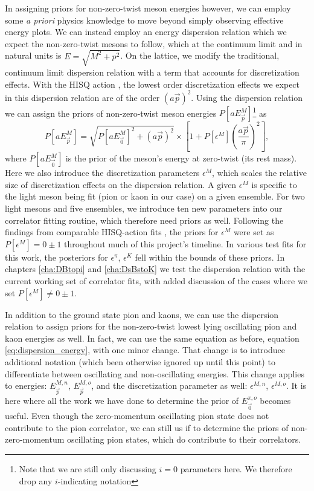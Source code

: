 In assigning priors for non-zero-twist meson energies however, we can employ some \textit{a priori} physics knowledge to move beyond simply observing effective energy plots.  We can instead employ an energy dispersion relation which we expect the non-zero-twist mesons to follow, which at the continuum limit and in natural units is $E = \sqrt{M^2 + p^2}$.  On the lattice, we modify the traditional, continuum limit dispersion relation with a term that accounts for discretization effects.  With the HISQ action \cite{HISQ:2006rc}, the lowest order discretization effects we expect in this dispersion relation are of the order $(a\vec{p})^2$.  Using the dispersion relation we can assign the priors of non-zero-twist meson energies $P[aE^M_{\vec{p}}]$\footnote{Note that we are still only discussing $i=0$ parameters here.  We therefore drop any $i$-indicating notation} as
\begin{equation}\label{eq:dispersion_energy}
   P[aE^M_{\vec{p}}] = \sqrt{P[aE^M_{\vec{0}}]^2 + (a\vec{p})^2}
   \times \left[ 1 + P[\epsilon^M] \left( \frac{a\vec{p}}{\pi} \right)^2     \right],
\end{equation}
where $P[aE^M_{\vec{0}}]$ is the prior of the meson's energy at zero-twist (its rest mass).  Here we also introduce the discretization parameters $\epsilon^M$, which scales the relative size of discretization effects on the dispersion relation.  A given $\epsilon^M$ is specific to the light meson being fit (pion or kaon in our case) on a given ensemble.  For two light mesons and five ensembles, we introduce ten new parameters into our correlator fitting routine, which therefore need priors as well.  Following the findings from comparable HISQ-action fits \cite{Bouchard_2013, Will_towardsB, Chakraborty_2021, Will_technical}, the priors for $\epsilon^{M}$ were set as $P[\epsilon^M] = 0\pm1$ throughout much of this project's timeline.  In various test fits for this work, the posteriors for $\epsilon^{\pi}$, $\epsilon^{K}$ fell within the bounds of these priors. In chapters \ref{cha:DBtopi} and \ref{cha:DsBstoK} we test the dispersion relation with the current working set of correlator fits, with added discussion of the cases where we set $P[\epsilon^M] \neq 0\pm1$.

In addition to the ground state pion and kaons, we can use the dispersion relation to assign priors for the non-zero-twist lowest lying oscillating pion and kaon energies as well.  In fact, we can use the same equation as before, equation \ref{eq:dispersion_energy}, with one minor change.  That change is to introduce additional notation (which been otherwise ignored up until this point) to differentiate between oscillating and non-oscillating energies.  This change applies to energies: $E^{M,n}_{\vec{p}}$, $E^{M,o}_{\vec{p}}$, and the discretization parameter as well: $\epsilon^{M,n}$,  $\epsilon^{M,o}$.  It is here where all the work we have done to determine the prior of $E^{\pi,o}_{\vec{0}}$ becomes useful.  Even though the zero-momentum oscillating pion state does not contribute to the pion correlator, we can still us if to determine the priors of non-zero-momentum oscillating pion states, which do contribute to their correlators.

